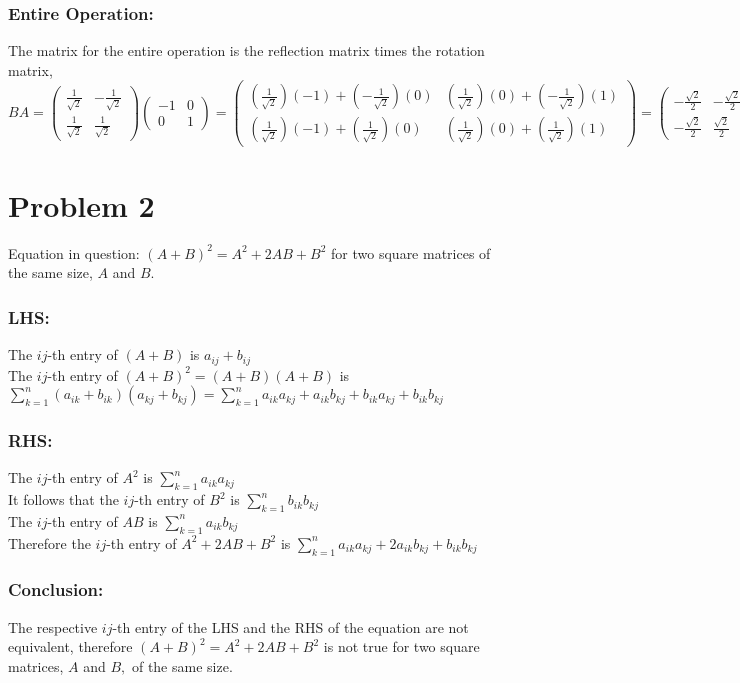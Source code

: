 \documentclass{article}
\begin{document}
\subsubsection*{Entire Operation:}
The matrix for the entire operation is the reflection matrix times the rotation matrix,\\
$BA=\begin{pmatrix}\frac{1}{\sqrt{2}} & -\frac{1}{\sqrt{2}}\\ \frac{1}{\sqrt{2}} & \frac{1}{\sqrt{2}} \end{pmatrix}\begin{pmatrix}-1 & 0\\ 0 & 1\end{pmatrix}=
\begin{pmatrix}(\frac{1}{\sqrt{2}})(-1)+(-\frac{1}{\sqrt{2}})(0) & (\frac{1}{\sqrt{2}})(0)+(-\frac{1}{\sqrt{2}})(1)\\ (\frac{1}{\sqrt{2}})(-1)+(\frac{1}{\sqrt{2}})(0) & (\frac{1}{\sqrt{2}})(0)+(\frac{1}{\sqrt{2}})(1) \end{pmatrix}=
\begin{pmatrix} -\frac{\sqrt{2}}{2} & -\frac{\sqrt{2}}{2}\\ -\frac{\sqrt{2}}{2} & \frac{\sqrt{2}}{2}
\end{pmatrix}
$
\pagebreak

\section*{Problem 2}
Equation in question: $(A+B)^2=A^2+2AB+B^2$ for two square matrices of the same size, $A$ and $B$.
\subsubsection*{LHS:}
The $ij$-th entry of $(A+B) $ is $a_{ij}+b_{ij}$\\
The $ij$-th entry of $(A+B)^2 = (A+B)(A+B)$ is $\sum_{k=1}^n (a_{ik}+b_{ik})(a_{kj}+b_{kj})= \sum_{k=1}^n a_{ik}a_{kj}+a_{ik}b_{kj}+b_{ik}a_{kj}+b_{ik}b_{kj}$
\subsubsection*{RHS:}
The $ij$-th entry of $A^2$ is $\sum_{k=1}^n a_{ik}a_{kj}$\\
It follows that the $ij$-th entry of $B^2$ is $\sum_{k=1}^n b_{ik}b_{kj}$\\
The $ij$-th entry of $AB$ is $\sum_{k=1}^n a_{ik}b_{kj}$\\
Therefore the $ij$-th entry of $A^2+2AB+B^2$ is $\sum_{k=1}^n a_{ik}a_{kj} + 2a_{ik}b_{kj}+ b_{ik}b_{kj}$
\subsubsection*{Conclusion:}
The respective $ij$-th entry of the LHS and the RHS of the equation are not equivalent, therefore $(A+B)^2=A^2+2AB+B^2$ is not true for two square matrices, $A$ and $B,$ of the same size.
\end{document}
